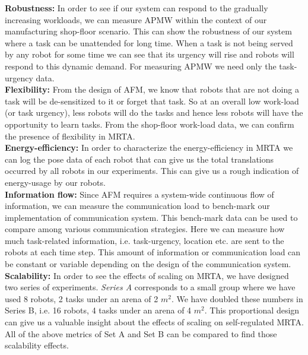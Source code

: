 \documentclass[preprint,12pt]{elsarticle}
\begin{document}
\textbf{Robustness:} In order to see if our system can respond to the gradually increasing workloads,  we can measure APMW within the context of our manufacturing shop-floor scenario. This can show the robustness of our system where a task can be  unattended for long time. When a task is not being served by any robot for some time we can see that its urgency will rise and robots will respond to this dynamic demand. For measuring APMW we need only the task-urgency data.\\
\textbf{Flexibility:} From the design of AFM, we know that robots that are not doing a task will be de-sensitized to it or forget that task. So at an overall low work-load (or task urgency), less robots will do the tasks and hence less robots will have the opportunity to learn tasks. From the shop-floor work-load data, we can confirm the presence of flexibility in MRTA.\\
\textbf{Energy-efficiency:} In order to characterize the energy-efficiency in MRTA we can log the pose data of each robot that can give us the total translations occurred by all robots in our experiments. This can give us a rough indication of energy-usage by our robots. \\
\textbf{Information flow:} Since AFM requires a system-wide continuous flow of information, we can measure the communication load to bench-mark our implementation of communication system. This bench-mark data can be used to compare among various communication strategies. Here we can measure  how much task-related information, i.e. task-urgency, location etc. are sent to the robots at each time step. This  amount of information or communication load can be constant or variable depending on the design of the communication system.
\textbf{Scalability:} In order to see the effects of scaling on MRTA, we have designed two series of experiments. {\em Series A} corresponds to a small group where we have used 8 robots, 2 tasks under an arena of 2 $m^2$. We have doubled these numbers in {Series B}, i.e. 16 robots, 4 tasks under an arena of 4 $m^2$. This proportional design can give us a valuable insight about the effects of scaling on self-regulated MRTA. All of the above metrics of Set A and Set B can be compared to find those scalability effects.
\end{document}
